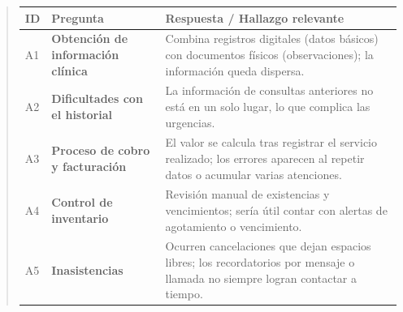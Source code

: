 \documentclass[
]{article}
\newcounter{none} %
\begin{document}
\begin{quote}
{\def\LTcaptype{none} %
\begin{longtable}[]{|
  >{\centering\arraybackslash}p{}|
  >{\raggedright\arraybackslash}p{}|
  >{\raggedright\arraybackslash}p{}|}
\hline
\begin{minipage}[b]{\linewidth}\centering
\textbf{ID}
\end{minipage} & \begin{minipage}[b]{\linewidth}\centering
\textbf{Pregunta}
\end{minipage} & \begin{minipage}[b]{\linewidth}\raggedright
\textbf{Respuesta / Hallazgo relevante}
\end{minipage} \\
\hline
\endhead
\hline
\endlastfoot
A1 & \textbf{Obtención de información clínica} &
\begin{minipage}[t]{\linewidth}\raggedright
Combina registros digitales (datos básicos) con documentos físicos (observaciones); la información queda dispersa.
\end{minipage} \\
\hline
A2 & \textbf{Dificultades con el historial} &
\begin{minipage}[t]{\linewidth}\raggedright
La información de consultas anteriores no está en un solo lugar, lo que complica las urgencias.
\end{minipage} \\
\hline
A3 & \textbf{Proceso de cobro y facturación} &
\begin{minipage}[t]{\linewidth}\raggedright
El valor se calcula tras registrar el servicio realizado; los errores aparecen al repetir datos o acumular varias atenciones.
\end{minipage} \\
\hline
A4 & \textbf{Control de inventario} &
\begin{minipage}[t]{\linewidth}\raggedright
Revisión manual de existencias y vencimientos; sería útil contar con alertas de agotamiento o vencimiento.
\end{minipage} \\
\hline
A5 & \textbf{Inasistencias} &
\begin{minipage}[t]{\linewidth}\raggedright
Ocurren cancelaciones que dejan espacios libres; los recordatorios por mensaje o llamada no siempre logran contactar a tiempo.
\end{minipage} \\

\end{longtable}}
\end{quote}
\end{document}
